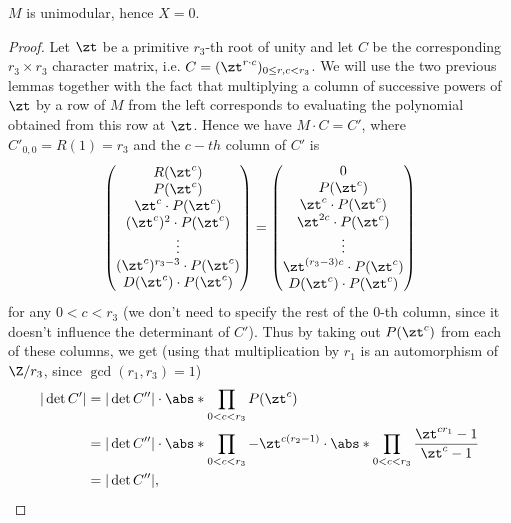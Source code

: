 \begin{prop}
$M$ is unimodular, hence $X=0$.
\end{prop}
\begin{proof}
Let $\zt$ be a primitive $r_3$-th root of unity and let $C$ be the corresponding $r_3\times r_3$ character matrix, i.e. $C=(\zt^{r\cdot c})_{0\leq r,c<r_3}$. We will use the two previous lemmas together with the fact that multiplying a column of successive powers of $\zt$ by a row of $M$ from the left corresponds to evaluating the polynomial obtained from this row at $\zt$. %
Hence we have $M\cdot C=C'$, where $C'_{0,0}=R(1)=r_3$ and the $c-th$ column of $C'$ is
$$
\begin{pmatrix}
R(\zt^c)\\ 
P(\zt^c) \\ 
\zt^c \cdot P(\zt^c) \\ 
(\zt^{c})^2 \cdot P(\zt^c) \\ 
\vdots\\ 
(\zt^{c})^{r_3-3} \cdot P(\zt^c) \\ 
D(\zt^c) \cdot P(\zt^c)
\end{pmatrix}
=
\begin{pmatrix}
0\\ 
P(\zt^c) \\ 
\zt^c \cdot P(\zt^c) \\ 
\zt^{2c} \cdot P(\zt^c) \\ 
\vdots\\ 
\zt^{(r_3-3)c} \cdot P(\zt^c) \\ 
D(\zt^c) \cdot P(\zt^c)
\end{pmatrix}
$$
for any $0<c<r_3$ (we don't need to specify the rest of the $0$-th column, since it doesn't influence the determinant of $C'$). Thus by taking out $P(\zt^c)$ from each of these columns, we get (using that multiplication by $r_1$ is an automorphism of $\Z/r_3$, since $\gcd(r_1,r_3)=1$)
\begin{align*}
|\det C'|&=|\det C''|\cdot\abs*{\prod_{0<c<r_3}P(\zt^c)}\\
&=|\det C''|\cdot\abs*{\prod_{0<c<r_3}-\zt^{c(r_2-1)}}\cdot\abs*{\prod_{0<c<r_3}\frac{\zt^{cr_1}-1}{\zt^c-1}}\\
&=|\det C''|,
\end{align*}


\end{proof}
